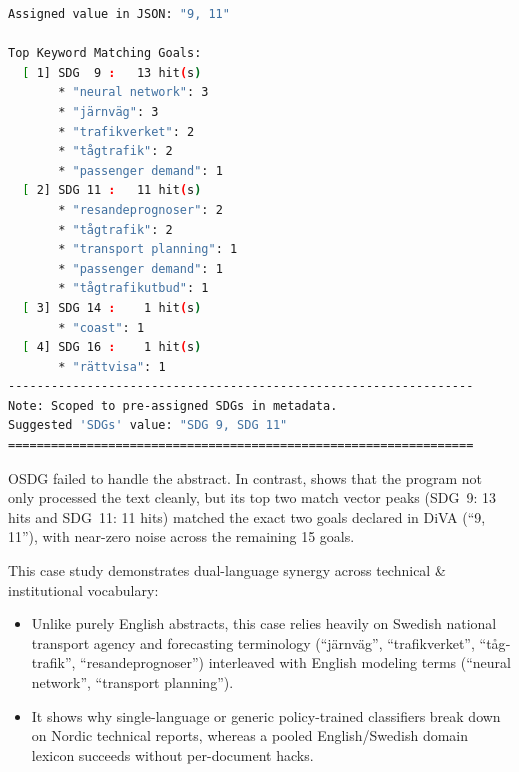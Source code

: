\begin{casestudySection}
\begin{lstlisting}[language={bash}, basicstyle=\footnotesize, escapechar=|, breaklines=true,
    postbreak=\usebox{\lstbreakbox}, caption={Program's output}, label=lst:t_144856Output]
Assigned value in JSON: "9, 11"

Top Keyword Matching Goals:
  [ 1] SDG  9 :   13 hit(s)
       * "neural network": 3
       * "järnväg": 3
       * "trafikverket": 2
       * "tågtrafik": 2
       * "passenger demand": 1
  [ 2] SDG 11 :   11 hit(s)
       * "resandeprognoser": 2
       * "tågtrafik": 2
       * "transport planning": 1
       * "passenger demand": 1
       * "tågtrafikutbud": 1
  [ 3] SDG 14 :    1 hit(s)
       * "coast": 1
  [ 4] SDG 16 :    1 hit(s)
       * "rättvisa": 1
-----------------------------------------------------------------
Note: Scoped to pre-assigned SDGs in metadata.
Suggested 'SDGs' value: "SDG 9, SDG 11"
=================================================================
\end{lstlisting}

OSDG failed to handle the abstract. In contrast,  shows that the program not only processed the text cleanly, but its top two match vector peaks (\gls{SDG}~9: \num{13} hits and \gls{SDG}~11: \num{11} hits) matched the exact two goals declared in \gls{DiVA} (\enquote{9, 11}), with near-zero noise across the remaining \num{15} goals.

This case study demonstrates dual-language synergy across technical \& institutional vocabulary:
\begin{itemize}
    \item Unlike purely English abstracts, this case relies heavily on Swedish national transport agency and forecasting terminology (\enquote{\foreignlanguage{swedish}{järnväg}}, \enquote{\foreignlanguage{swedish}{trafikverket}}, \enquote{\foreignlanguage{swedish}{tågtrafik}}, \enquote{\foreignlanguage{swedish}{resandeprognoser}}) interleaved with English modeling terms (\enquote{neural network},  \enquote{transport planning}).

    \item It shows why single-language or generic policy-trained classifiers break down on Nordic technical reports, whereas a pooled English/Swedish domain lexicon succeeds without per-document hacks.
\end{itemize}



\end{casestudySection}
